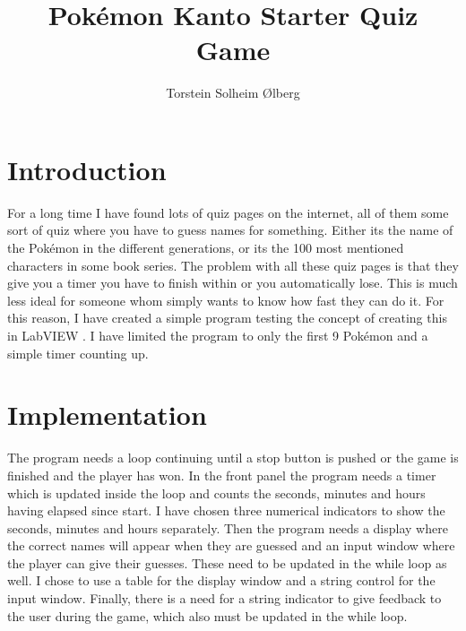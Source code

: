 \documentclass[11pt, A4paper, english]{article}
\author{Torstein Solheim Ølberg}
\title{Pokémon Kanto Starter Quiz Game}
\begin{document}
	\maketitle
	\clearpage

	\section{Introduction}
For a long time I have found lots of quiz pages on the internet, all of them some sort of quiz where you have to guess names for something. Either its the name of the Pokémon in the different generations, or its the 100 most mentioned characters in some book series. The problem with all these quiz pages is that they give you a timer you have to finish within or you automatically lose. This is much less ideal for someone whom simply wants to know how fast they can do it. For this reason, I have created a simple program testing the concept of creating this in LabVIEW \cite{LabView}. I have limited the program to only the first 9 Pokémon and a simple timer counting up.

	\section{Implementation}
The program needs a loop continuing until a stop button is pushed or the game is finished and the player has won. In the front panel the program needs a timer which is updated inside the loop and counts the seconds, minutes and hours having elapsed since start. I have chosen three numerical indicators to show the seconds, minutes and hours separately. Then the program needs a display where the correct names will appear when they are guessed and an input window where the player can give their guesses. These need to be updated in the while loop as well. I chose to use a table for the display window and a string control for the input window. Finally, there is a need for a string indicator to give feedback to the user during the game, which also must be updated in the while loop. \\
\end{document}
